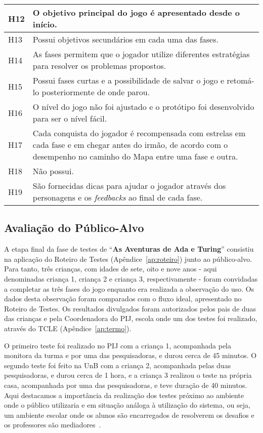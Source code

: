\begin{table}[H]
\begin{tabular}{|l|p{15.5cm}|}
H12 & O objetivo principal do jogo é apresentado desde o início. \\ \hline
H13 & Possui objetivos secundários em cada uma das fases.  \\ \hline
H14 & As fases permitem que o jogador utilize diferentes estratégias para resolver os problemas propostos.  \\ \hline
H15 & Possui fases curtas e a possibilidade de salvar o jogo e retomá-lo posteriormente de onde parou. \\ \hline
H16 & O nível do jogo não foi ajustado e o protótipo foi desenvolvido para ser o nível fácil.   \\ \hline
H17 & Cada conquista do jogador é recompensada com estrelas em cada fase e em chegar antes do irmão, de acordo com o desempenho no caminho do Mapa entre uma fase e outra. \\ \hline
H18 & Não possui. \\ \hline
H19 & São fornecidas dicas para ajudar o jogador através dos personagens e os \textit{feedbacks} ao final de cada fase. \\ \hline
\end{tabular}
\end{table}

\subsection{Avaliação do Público-Alvo} \label{ssec:publico-alvo}

A etapa final da fase de testes de “\textbf{As Aventuras de Ada e Turing}” consistiu na aplicação do Roteiro de Testes (Apêndice~\ref{ap:roteiro}) junto ao público-alvo. Para tanto, três crianças, com idades de sete, oito e nove anos - aqui denominadas criança 1, criança 2 e criança 3, respectivamente - foram convidadas a completar as três fases do jogo enquanto era realizada a observação do uso. Os dados desta observação foram comparados com o fluxo ideal, apresentado no Roteiro de Testes. Os resultados divulgados foram autorizados pelos pais de duas das crianças e pela Coordenadora do \acrfull{PIJ}, escola onde um dos testes foi realizado, através do \acrshort{TCLE} (Apêndice~\ref{ap:termo}). 

O primeiro teste foi realizado no \acrshort{PIJ} com a criança 1, acompanhada pela monitora da turma e por uma das pesquisadoras, e durou cerca de 45 minutos. O segundo teste foi feito na \acrshort{UnB} com a criança 2, acompanhada pelas duas pesquisadoras, e durou cerca de 1 hora, e a criança 3 realizou o teste na própria casa, acompanhada por uma das pesquisadoras, e teve duração de 40 minutos. Aqui destacamos a importância da realização dos testes próximo ao ambiente onde o público utilizaria e em situação análoga à utilização do sistema, ou seja, um ambiente escolar onde os alunos são encarregados de resolverem os desafios e os professores são mediadores~\cite{silva_pensamento_2016}.

